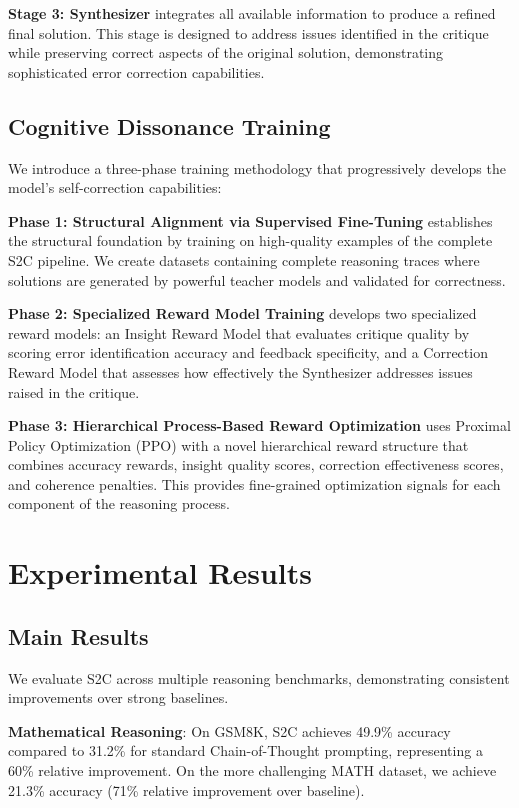 \documentclass[10pt,twocolumn]{article}
\newcommand{\ssc}{\textsc{S2C}}
\begin{document}
\textbf{Stage 3: Synthesizer} integrates all available information to produce a refined final solution. This stage is designed to address issues identified in the critique while preserving correct aspects of the original solution, demonstrating sophisticated error correction capabilities.

\subsection{Cognitive Dissonance Training}

We introduce a three-phase training methodology that progressively develops the model's self-correction capabilities:

\textbf{Phase 1: Structural Alignment via Supervised Fine-Tuning} establishes the structural foundation by training on high-quality examples of the complete \ssc{} pipeline. We create datasets containing complete reasoning traces where solutions are generated by powerful teacher models and validated for correctness.

\textbf{Phase 2: Specialized Reward Model Training} develops two specialized reward models: an Insight Reward Model that evaluates critique quality by scoring error identification accuracy and feedback specificity, and a Correction Reward Model that assesses how effectively the Synthesizer addresses issues raised in the critique.

\textbf{Phase 3: Hierarchical Process-Based Reward Optimization} uses Proximal Policy Optimization (PPO) with a novel hierarchical reward structure that combines accuracy rewards, insight quality scores, correction effectiveness scores, and coherence penalties. This provides fine-grained optimization signals for each component of the reasoning process.

\section{Experimental Results}

\subsection{Main Results}

We evaluate \ssc{} across multiple reasoning benchmarks, demonstrating consistent improvements over strong baselines.

\textbf{Mathematical Reasoning}: On GSM8K, \ssc{} achieves 49.9\% accuracy compared to 31.2\% for standard Chain-of-Thought prompting, representing a 60\% relative improvement. On the more challenging MATH dataset, we achieve 21.3\% accuracy (71\% relative improvement over baseline).
\end{document}
